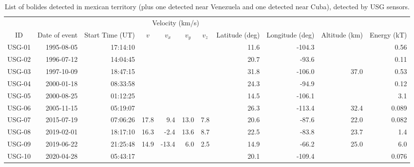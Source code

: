 \begin{table}
    \centering
  \footnotesize
  \caption{List of bolides detected in mexican territory (plus one detected near Venezuela and one detected near Cuba), detected by USG sensors.}
\label{tab:table-meteors-2}
\begin{tabular}{rrrrrrrrrrr}
       &               &                  & \multicolumn{4}{c}{Velocity (km/s)}       &                   &                 &\\\cline{4-7}
\multicolumn{1}{c}{ID}&\multicolumn{1}{c}{Date of event}&\multicolumn{1}{c}{Start Time (UT)}&\multicolumn{1}{c}{$v$}&\multicolumn{1}{c}{$v_x$}&\multicolumn{1}{c}{$v_y$}&\multicolumn{1}{c}{$v_z$}&\multicolumn{1}{c}{Latitude (deg)}&\multicolumn{1}{c}{Longitude (deg)}&\multicolumn{1}{c}{Altitude (km)} & \multicolumn{1}{c}{Energy (kT)}\\\hline
USG-01 & 1995-08-05    & 17:14:10         &      &         &           &              & 11.6              &  -104.3         &             &  0.56\\
USG-02 & 1996-07-12    & 14:04:45         &      &         &           &              & 20.7              &   -93.6         &             &  0.11\\ 
USG-03 & 1997-10-09    & 18:47:15         &      &         &           &              & 31.8              &  -106.0         &   37.0      &  0.53\\
USG-04 & 2000-01-18    & 08:33:58         &      &         &           &              & 24.3              &   -94.9         &             &  0.12\\
USG-05 & 2000-08-25    & 01:12:25         &      &         &           &              & 14.5              &  -106.1         &             &   3.1\\
USG-06 & 2005-11-15    & 05:19:07         &      &         &           &              & 26.3              &  -113.4         &   32.4      & 0.089\\
USG-07 & 2015-07-19    & 07:06:26         & 17.8 &   9.4   &  13.0     & 7.8          & 20.6              &   -87.6         &   22.0      & 0.082\\
USG-08 & 2019-02-01    & 18:17:10         & 16.3 &  -2.4   &  13.6     & 8.7          & 22.5              &   -83.8         &   23.7      &   1.4\\
USG-09 & 2019-06-22    & 21:25:48         & 14.9 & -13.4   &   6.0     & 2.5          & 14.9              &   -66.2         &   25.0      &   6.0\\
USG-10 & 2020-04-28    & 05:43:17         &      &         &           &              & 20.1              &  -109.4         &             & 0.076\\\hline  
  \end{tabular}
\end{table}


